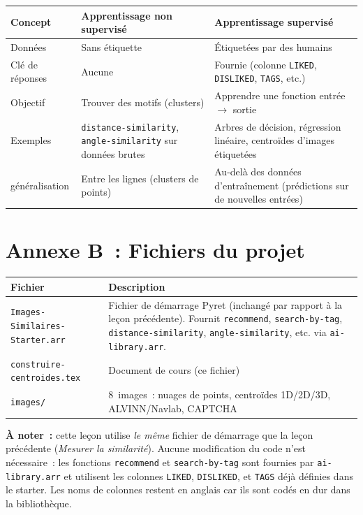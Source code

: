 \documentclass[12pt,a4paper]{article}
\begin{document}
\begin{center}
\begin{tabularx}{\textwidth}{l X X}
  \toprule
  \textbf{Concept} & \textbf{Apprentissage non supervisé} & \textbf{Apprentissage supervisé} \\
  \midrule
  Données       & Sans étiquette                          & Étiquetées par des humains \\
  Clé de réponses & Aucune                                & Fournie (colonne \texttt{LIKED}, \texttt{DISLIKED}, \texttt{TAGS}, etc.) \\
  Objectif      & Trouver des motifs (clusters)           & Apprendre une fonction entrée $\to$ sortie \\
  Exemples      & \texttt{distance-similarity}, \texttt{angle-similarity} sur données brutes & Arbres de décision, régression linéaire, centroïdes d'images étiquetées \\
  généralisation & Entre les lignes (clusters de points)  & Au-delà des données d'entraînement (prédictions sur de nouvelles entrées) \\
  \bottomrule
\end{tabularx}
\end{center}

\section*{Annexe B~: Fichiers du projet}

\begin{center}
\begin{tabularx}{\textwidth}{l X}
  \toprule
  \textbf{Fichier} & \textbf{Description} \\
  \midrule
  \texttt{Images\allowbreak-Similaires\allowbreak-Starter.arr} & Fichier de démarrage Pyret (inchangé par rapport à la leçon précédente). Fournit \texttt{recommend}, \texttt{search-by-tag}, \texttt{distance-similarity}, \texttt{angle-similarity}, etc. via \texttt{ai-library.arr}. \\
  \texttt{construire-centroides.tex} & Document de cours (ce fichier) \\
  \texttt{images/} & 8~images~: nuages de points, centroïdes 1D/2D/3D, ALVINN/Navlab, CAPTCHA \\
  \bottomrule
\end{tabularx}
\end{center}

\vspace{1em}
\textbf{À noter~:} cette leçon utilise \emph{le même} fichier de démarrage que la leçon précédente (\emph{Mesurer la similarité}). Aucune modification du code n'est nécessaire~: les fonctions \texttt{recommend} et \texttt{search-by-tag} sont fournies par \texttt{ai-library.arr} et utilisent les colonnes \texttt{LIKED}, \texttt{DISLIKED}, et \texttt{TAGS} déjà définies dans le starter. Les noms de colonnes restent en anglais car ils sont codés en dur dans la bibliothèque.
\end{document}

